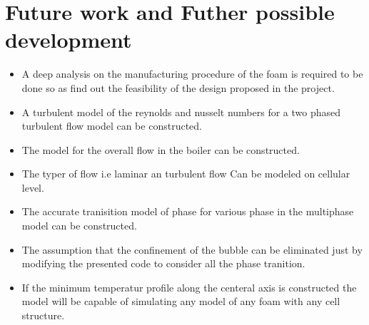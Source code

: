 \documentclass[compileTAMUreport.tex]{subfiles}
\begin{document}
\section{Future work and Futher possible development}
\begin{itemize}
\item A deep analysis on the manufacturing procedure of the foam is required to be done so as find out the feasibility of the design proposed in the project. 

\item A turbulent model of the reynolds and nusselt numbers for a two phased turbulent flow model can be constructed.

\item The model for the overall flow in the boiler can be constructed.

\item The typer of flow i.e laminar an turbulent flow Can be modeled on cellular level. 

\item The accurate tranisition model of phase for various phase in the multiphase model can be constructed.

\item The assumption that the confinement of the bubble can be eliminated just by modifying the presented code to consider all the phase tranition.

\item If the minimum temperatur profile along the centeral axis is constructed the model will be capable of simulating any model of any foam with any cell structure. 

\end{itemize}
\end{document}
